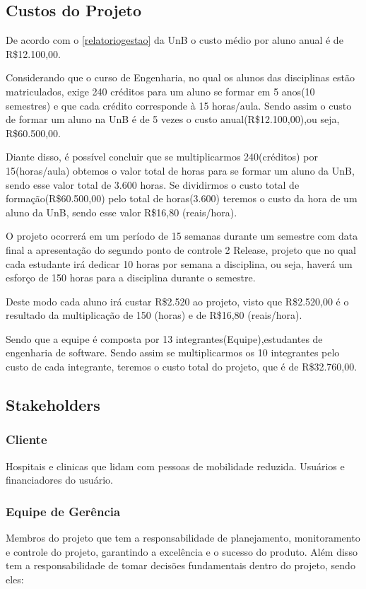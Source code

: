 \subsection{Custos do Projeto}
De acordo com o \ref{relatoriogestao} da UnB o custo médio por aluno 
anual é de R\$12.100,00.

Considerando que o curso de Engenharia, no qual os alunos das 
disciplinas estão matriculados, exige 240 créditos para um aluno se formar em 
5 anos(10 semestres) e que cada crédito corresponde à 15 
horas/aula. Sendo assim o custo de formar um aluno na UnB é de 5 
vezes o custo anual(R\$12.100,00),ou seja, R\$60.500,00.

Diante disso, é possível concluir que se multiplicarmos 240(créditos) por 
15(horas/aula) obtemos o valor total de horas para se formar um aluno da UnB,
sendo esse valor total de 3.600 horas. Se dividirmos o custo total de 
formação(R\$60.500,00) pelo total de horas(3.600) teremos o custo da hora 
de um aluno da UnB, sendo esse valor R\$16,80 (reais/hora).

O projeto ocorrerá em um período de 15 semanas durante um semestre com data 
final a apresentação do segundo ponto de controle 2 Release, projeto que no qual cada estudante irá 
dedicar 10 horas por semana a disciplina, ou seja, haverá um esforço de 150 
horas para a disciplina durante o semestre.

Deste modo cada aluno irá custar R\$2.520 ao projeto, visto que R\$2.520,00 é o 
resultado da multiplicação de 150 (horas) e de R\$16,80 (reais/hora).

Sendo que a equipe é composta por 13 integrantes(Equipe),estudantes de 
engenharia de software. Sendo assim se multiplicarmos os 10 integrantes pelo 
custo de cada integrante, teremos o custo total do projeto, que é de 
R\$32.760,00.

\subsection{Stakeholders}

\subsubsection{Cliente}
Hospitais e clinicas que lidam com pessoas de mobilidade reduzida. Usuários e financiadores do usuário.

\subsubsection{Equipe de Gerência}
Membros do projeto que tem a responsabilidade de planejamento, monitoramento 
e controle do projeto, garantindo a excelência e o sucesso do produto. Além 
disso tem a responsabilidade de tomar decisões fundamentais dentro do projeto, 
sendo eles:

